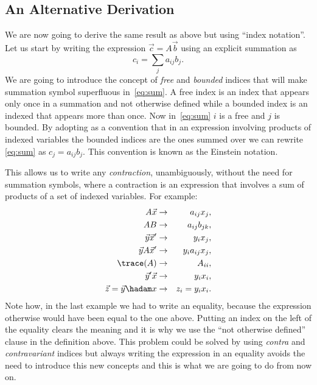 \documentclass{article}
\begin{document}

\subsection{An Alternative Derivation}


We are now going to derive the same result as above but using ``index
notation''. Let us start by writing the expression \(\vec c = A \vec b\) using an
explicit summation as
\begin{equation}
	c_i = \sum_j a_{ij} b_j. \label{eq:sum}
\end{equation}
We are going to introduce the concept of \emph{free} and \emph{bounded} indices
that will make summation symbol superfluous in~\ref{eq:sum}. A free index is an
index that appears only once in a summation and not otherwise defined while a
bounded index is an indexed that appears more than once. Now in~\ref{eq:sum}
\(i\) is a free and \(j\) is bounded. By adopting as a convention that in an
expression involving products of indexed variables the bounded indices are the
ones summed over we can rewrite \ref{eq:sum} as \(c_j = a_{ij} b_{j}\). This
convention is known as the Einstein notation.

This allows us to write any \emph{contraction}, unambiguously, without the need
for summation symbols, where a contraction is an expression that involves a sum
of products of a set of indexed variables. For example:
\begin{eqnarray*}
A \vec x &\rightarrow& a_{ij} x_j, \\
A B &\rightarrow& a_{ij} b_{jk}, \\
\vec y \vec x' &\rightarrow& y_i x_j, \\
\vec y A \vec x' &\rightarrow& y_i a_{ij} x_j, \\
\trace(A) &\rightarrow& A_{ii}, \\
\vec y' \vec x &\rightarrow& y_i x_i, \\
\vec z = \vec y \hadam x &\rightarrow& z_i = y_i x_i.
\end{eqnarray*}
Note how, in the last example we had to write an equality, because the
expression otherwise would have been equal to the one above. Putting an index on
the left of the equality clears the meaning and it is why we use
the ``not otherwise defined'' clause in the definition above. This problem could
be solved by using \emph{contra} and \emph{contravariant} indices but always
writing the expression in an equality avoids the need to introduce this new
concepts and this is what we are going to do from now on.
\end{document}
